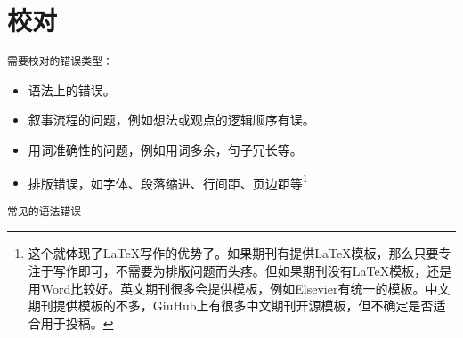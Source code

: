\documentclass[cn,hazy,blue,14pt,screen]{elegantnote} %
\begin{document}
\newpage

\section{校对}

\lstinline{需要校对的错误类型：}

\begin{itemize}
  \item 语法上的错误。
  \item 叙事流程的问题，例如想法或观点的逻辑顺序有误。
  \item 用词准确性的问题，例如用词多余，句子冗长等。
  \item 排版错误，如字体、段落缩进、行间距、页边距等\footnote{这个就体现了\LaTeX{}写作的优势了。如果期刊有提供\LaTeX{}模板，那么只要专注于写作即可，不需要为排版问题而头疼。但如果期刊没有\LaTeX{}模板，还是用Word比较好。英文期刊很多会提供模板，例如Elsevier有统一的模板。中文期刊提供模板的不多，GiuHub上有很多中文期刊开源模板，但不确定是否适合用于投稿。}
\end{itemize}

\lstinline{常见的语法错误}
\end{document}
